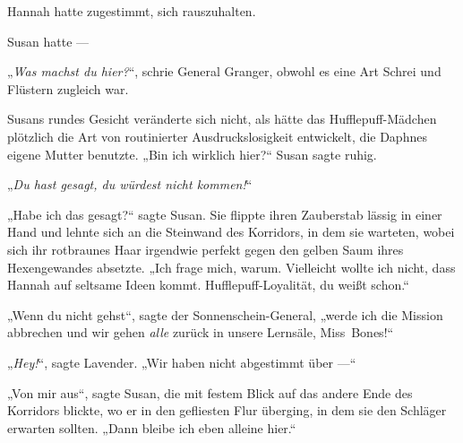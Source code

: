 Hannah hatte zugestimmt, sich rauszuhalten.

Susan hatte —

\later

„\emph{Was machst du hier?}“, schrie General Granger, obwohl es eine Art Schrei und Flüstern zugleich war.

Susans rundes Gesicht veränderte sich nicht, als hätte das Hufflepuff-Mädchen plötzlich die Art von routinierter Ausdruckslosigkeit entwickelt, die Daphnes eigene Mutter benutzte.
„Bin ich wirklich hier?“ Susan sagte ruhig.

„\emph{Du hast gesagt, du würdest nicht kommen!}“

„Habe ich das gesagt?“ sagte Susan. Sie flippte ihren Zauberstab lässig in einer Hand und lehnte sich an die Steinwand des Korridors, in dem sie warteten, wobei sich ihr rotbraunes Haar irgendwie perfekt gegen den gelben Saum ihres Hexengewandes absetzte.
„Ich frage mich, warum. Vielleicht wollte ich nicht, dass Hannah auf seltsame Ideen kommt. Hufflepuff-Loyalität, du weißt schon.“

„Wenn du nicht gehst“, sagte der Sonnenschein-General, „werde ich die Mission abbrechen und wir gehen \emph{alle} zurück in unsere Lernsäle, Miss~Bones!“

„\emph{Hey!}“, sagte Lavender.
„Wir haben nicht abgestimmt über —“

„Von mir aus“, sagte Susan, die mit festem Blick auf das andere Ende des Korridors blickte, wo er in den gefliesten Flur überging, in dem sie den Schläger erwarten sollten.
„Dann bleibe ich eben alleine hier.“

